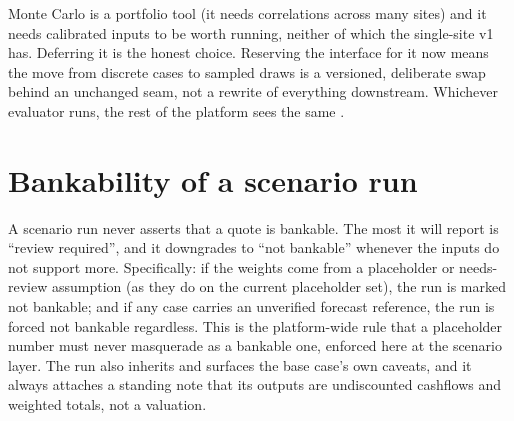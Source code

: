 \begin{keyidea}
Monte Carlo is a portfolio tool (it needs correlations across many sites) and it needs calibrated inputs to be worth running, neither of which the single-site v1 has. Deferring it is the honest choice. Reserving the interface for it now means the move from discrete cases to sampled draws is a versioned, deliberate swap behind an unchanged seam, not a rewrite of everything downstream. Whichever evaluator runs, the rest of the platform sees the same .
\end{keyidea}

\section{Bankability of a scenario run}

A scenario run never asserts that a quote is bankable. The most it will report is ``review required'', and it downgrades to ``not bankable'' whenever the inputs do not support more. Specifically: if the weights come from a placeholder or needs-review assumption (as they do on the current  placeholder set), the run is marked not bankable; and if any case carries an unverified forecast reference, the run is forced not bankable regardless. This is the platform-wide rule that a placeholder number must never masquerade as a bankable one, enforced here at the scenario layer. The run also inherits and surfaces the base case's own caveats, and it always attaches a standing note that its outputs are undiscounted cashflows and weighted totals, not a valuation.

